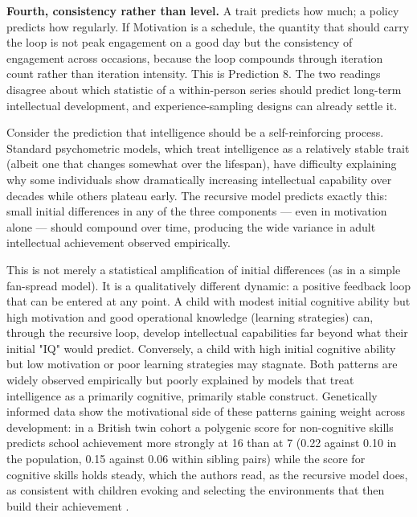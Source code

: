 \documentclass[12pt,a4paper]{article}
\begin{document}
\textbf{Fourth, consistency rather than level.} A trait predicts how much; a policy predicts how regularly. If Motivation is a schedule, the quantity that should carry the loop is not peak engagement on a good day but the consistency of engagement across occasions, because the loop compounds through iteration count rather than iteration intensity. This is Prediction 8. The two readings disagree about which statistic of a within-person series should predict long-term intellectual development, and experience-sampling designs can already settle it.

Consider the prediction that intelligence should be a self-reinforcing process. Standard psychometric models, which treat intelligence as a relatively stable trait (albeit one that changes somewhat over the lifespan), have difficulty explaining why some individuals show dramatically increasing intellectual capability over decades while others plateau early. The recursive model predicts exactly this: small initial differences in any of the three components ---\hspace{0pt} even in motivation alone ---\hspace{0pt} should compound over time, producing the wide variance in adult intellectual achievement observed empirically.

This is not merely a statistical amplification of initial differences (as in a simple fan-spread model). It is a qualitatively different dynamic: a positive feedback loop that can be entered at any point. A child with modest initial cognitive ability but high motivation and good operational knowledge (learning strategies) can, through the recursive loop, develop intellectual capabilities far beyond what their initial "IQ" would predict. Conversely, a child with high initial cognitive ability but low motivation or poor learning strategies may stagnate. Both patterns are widely observed empirically but poorly explained by models that treat intelligence as a primarily cognitive, primarily stable construct. Genetically informed data show the motivational side of these patterns gaining weight across development: in a British twin cohort a polygenic score for non-cognitive skills predicts school achievement more strongly at 16 than at 7 (0.22 against 0.10 in the population, 0.15 against 0.06 within sibling pairs) while the score for cognitive skills holds steady, which the authors read, as the recursive model does, as consistent with children evoking and selecting the environments that then build their achievement \citep{Malanchini2024}.
\end{document}
